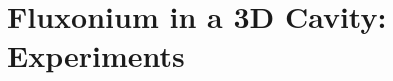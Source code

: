 \documentclass[12pt]{mitthesis}
\begin{document}
\chapter{Fluxonium in a 3D Cavity: Experiments\label{ch:4_3DGKP}}


\clearpage





% 

% 






\printbibliography[heading=subbibliography, title = References]
\clearpage

\cleardoublepage


\sloppy
\end{document}

